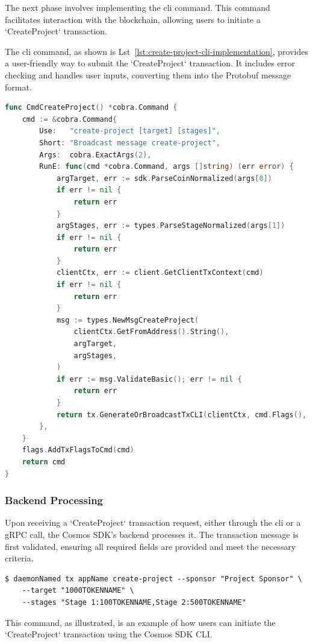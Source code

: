 The next phase involves implementing the \gls{cli} command. This command facilitates interaction with the blockchain, allowing users to initiate a `CreateProject` transaction.

The \gls{cli} command, as shown is Lst~\ref{lst:create-project-cli-implementation}, provides a user-friendly way to submit the `CreateProject` transaction. It includes error checking and handles user inputs, converting them into the Protobuf message format.

\newpage
\begin{lstlisting}[language=go, caption=CreateProject CLI protobuf definition, label={lst:create-project-cli-implementation}]
func CmdCreateProject() *cobra.Command {
	cmd := &cobra.Command{
		Use:   "create-project [target] [stages]",
		Short: "Broadcast message create-project",
		Args:  cobra.ExactArgs(2),
		RunE: func(cmd *cobra.Command, args []string) (err error) {
			argTarget, err := sdk.ParseCoinNormalized(args[0])
			if err != nil {
				return err
			}
			argStages, err := types.ParseStageNormalized(args[1])
			if err != nil {
				return err
			}
			clientCtx, err := client.GetClientTxContext(cmd)
			if err != nil {
				return err
			}
			msg := types.NewMsgCreateProject(
				clientCtx.GetFromAddress().String(),
				argTarget,
				argStages,
			)
			if err := msg.ValidateBasic(); err != nil {
				return err
			}
			return tx.GenerateOrBroadcastTxCLI(clientCtx, cmd.Flags(), msg)
		},
	}
	flags.AddTxFlagsToCmd(cmd)
	return cmd
}
\end{lstlisting}

\subsubsection{Backend Processing}
\label{subsubsec:backend-createproject}

Upon receiving a `CreateProject` transaction request, either through the \gls{cli} or a gRPC call, the Cosmos SDK's backend processes it. The transaction message is first validated, ensuring all required fields are provided and meet the necessary criteria.

\begin{verbatim}
$ daemonNamed tx appName create-project --sponsor "Project Sponsor" \
    --target "1000TOKENNAME" \
    --stages "Stage 1:100TOKENNAME,Stage 2:500TOKENNAME"
\end{verbatim}

This command, as illustrated, is an example of how users can initiate the `CreateProject` transaction using the Cosmos SDK CLI.

